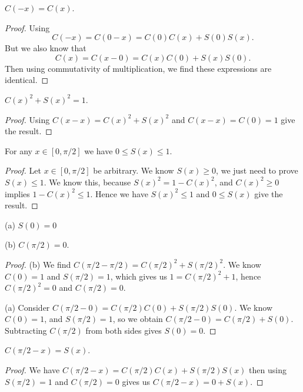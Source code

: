 \begin{proposition}\label{prop:cosine-is-even}
$C(-x) = C(x)$.
\end{proposition}
\begin{proof}
Using
\begin{equation}
C(-x) = C(0 - x) = C(0)C(x) + S(0)S(x).
\end{equation}
But we also know that
\begin{equation}
C(x) = C(x - 0) = C(x)C(0) + S(x)S(0).
\end{equation}
Then using commutativity of multiplication, we find these expressions
are identical.
\end{proof}

\begin{proposition}\label{prop:cos-sq-plus-sine-sq-equal-one}
$C(x)^{2} + S(x)^{2} = 1$.
\end{proposition}
\begin{proof}
Using $C(x-x) = C(x)^{2} + S(x)^{2}$ and $C(x-x)=C(0)=1$ give the result.
\end{proof}

\begin{proposition}\label{prop:sine-leq-one-when-x-leq-pi-over-two}
For any $x\in[0,\pi/2]$ we have $0\leq S(x)\leq 1$.
\end{proposition}

\begin{proof}
Let $x\in[0,\pi/2]$ be arbitrary. We know $S(x)\geq0$, we just need to
prove $S(x)\leq1$. We know this, because $S(x)^{2} = 1- C(x)^{2}$, and
$C(x)^{2}\geq 0$ implies $1-C(x)^{2}\leq 1$. Hence we have $S(x)^{2}\leq 1$
and $0\leq S(x)$ give the result.
\end{proof}

\begin{proposition}\label{prop:sine-of-zero}
  (a) $S(0) = 0$

  (b) $C(\pi/2) = 0$.
\end{proposition}
\begin{proof}
(b) We find $C(\pi/2 - \pi/2) = C(\pi/2)^{2} + S(\pi/2)^{2}$. We know
$C(0) = 1$ and $S(\pi/2) = 1$, which gives us $1 = C(\pi/2)^{2} + 1$,
hence $C(\pi/2)^{2} = 0$ and $C(\pi/2) = 0$.

(a)
Consider $C(\pi/2 - 0) = C(\pi/2)C(0) + S(\pi/2)S(0)$. We know $C(0)=1$,
and $S(\pi/2) = 1$, so we obtain $C(\pi/2 - 0) = C(\pi/2) + S(0)$.
Subtracting $C(\pi/2)$ from both sides gives $S(0)=0$.
\end{proof}

\begin{proposition}\label{prop:cos-pi-over-2-and-sine}
$C(\pi/2 - x) = S(x)$.
\end{proposition}
\begin{proof}
We have $C(\pi/2 - x) = C(\pi/2)C(x) + S(\pi/2) S(x)$
then using $S(\pi/2)=1$ and $C(\pi/2) = 0$ gives us
$C(\pi/2 - x) = 0 + S(x)$.
\end{proof}

